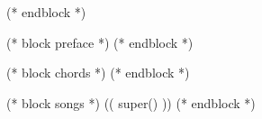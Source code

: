 \geometry{
 ((template_var.geometry))
}

\let\OldSongColumns=\songcolumns
\def\songcolumns#1{%
	(* if template_var.column_adjustment=="only_one" *)
	\OldSongColumns{1}
	(* elif template_var.column_adjustment=="two" *)
		\ifnum\value{inchordblock}>0
			\count0=#1\relax\advance\count0 by 1\relax%
			\OldSongColumns{2}
		\else
			\OldSongColumns{1}
		\fi
	(* elif template_var.column_adjustment=="one_more" *)
	\count0=#1\relax\advance\count0 by 1\relax%
	\OldSongColumns{\count0}
	(* else *)
	\OldSongColumns{#1}
	(* endif *)
}

(* endblock *)

(* block preface *)
(* endblock *)

(* block chords *)
(* endblock *)

(* block songs *)
\setcounter{inchordblock}{1}
(( super() ))
(* endblock *)
